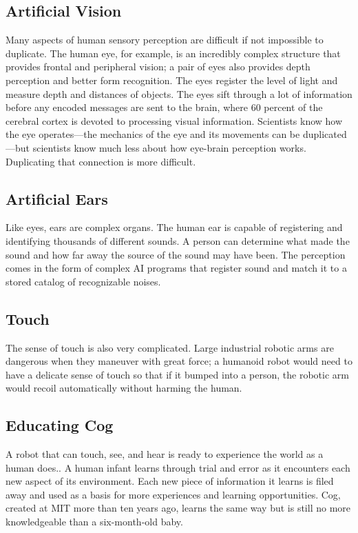 \documentclass[12pt]{article}
\begin{document}
\subsection{Artificial Vision}
\large
Many aspects of human sensory perception are difficult if not impossible to duplicate. The human eye, for example, is an incredibly complex structure that provides frontal and peripheral vision; a pair of eyes also provides depth perception and better form recognition.  The eyes register the level of light and measure depth and distances of objects. The eyes sift through a lot of information before any encoded messages are sent to the brain, where 60 percent of the cerebral cortex is devoted to processing visual information. Scientists know how the eye operates—the mechanics of the eye and its movements can be duplicated—but scientists know much less about how eye-brain perception works. Duplicating that connection is more difficult.\\
\huge
\subsection{Artificial Ears}
\large
 Like eyes, ears are complex organs. The human ear is capable of registering and identifying thousands of different sounds. A person can determine what made the sound and how far away the source of the sound may have been.  The perception comes in the form of complex AI programs that register sound and match it to a stored catalog of recognizable noises.\\
 \huge
 \subsection{Touch}
 \large
  The sense of touch is also very complicated. Large industrial robotic arms are dangerous when they maneuver with great force; a humanoid robot would need to have a delicate sense of touch so that if it bumped into a person, the robotic arm would recoil automatically without harming the human.\\
  \huge
  \subsection{Educating Cog}
  \large
   A robot that can touch, see, and hear is ready to experience the world as a human does.. A human infant learns through trial and error as it encounters each new aspect of its environment. Each new piece of information it learns is filed away and used as a basis for more experiences and learning opportunities. Cog, created at MIT more than ten years ago, learns the same way but is still no more knowledgeable than a six-month-old baby.\\
   \huge
\end{document}
